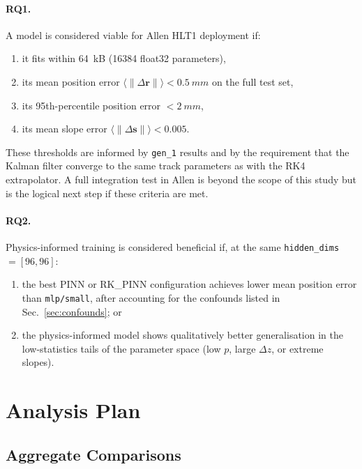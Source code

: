 \documentclass[a4paper,11pt]{article}
\newcommand{\SI}[2]{#1~#2}
\newcommand{\num}[1]{#1}
\newcommand{\kilo}{k}
\newcommand{\byte}{B}
\newcommand{\mm}{mm}
\newcommand{\dz}{\Delta z}
\begin{document}
\paragraph{RQ1.}
A model is considered viable for Allen HLT1 deployment if:
\begin{enumerate}
  \item it fits within \SI{64}{\kilo\byte} (\num{16384} float32 parameters),
  \item its mean position error $\langle\|\Delta\mathbf{r}\|\rangle
    < \SI{0.5}{\mm}$ on the full test set,
  \item its 95th-percentile position error $< \SI{2}{\mm}$,
  \item its mean slope error $\langle\|\Delta\mathbf{s}\|\rangle < 0.005$.
\end{enumerate}
These thresholds are informed by \texttt{gen\_1} results and by the
requirement that the Kalman filter converge to the same track parameters
as with the RK4 extrapolator.  A full integration test in Allen is beyond
the scope of this study but is the logical next step if these criteria
are met.

\paragraph{RQ2.}
Physics-informed training is considered beneficial if, at the same
\texttt{hidden\_dims}~$= [96, 96]$:
\begin{enumerate}
  \item the best PINN or RK\_PINN configuration achieves lower mean
    position error than \texttt{mlp/small}, after accounting for the
    confounds listed in Sec.~\ref{sec:confounds}; or
  \item the physics-informed model shows qualitatively better
    generalisation in the low-statistics tails of the parameter space
    (low $p$, large $\dz$, or extreme slopes).
\end{enumerate}

\section{Analysis Plan}
\label{sec:analysis_plan}

\subsection{Aggregate Comparisons}
\end{document}
